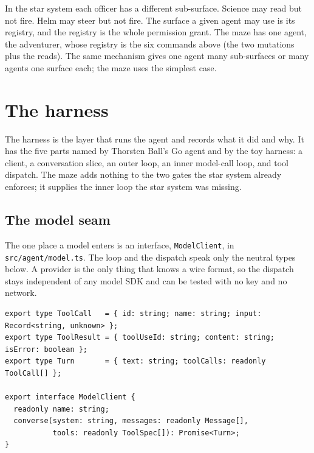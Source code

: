 \documentclass[11pt]{article}
\newcommand{\code}[1]{\texttt{#1}}
\begin{document}
\begin{keybox}
In the star system each officer has a different sub-surface. Science may read but
not fire. Helm may steer but not fire. The surface a given agent may use is its
registry, and the registry is the whole permission grant. The maze has one agent,
the adventurer, whose registry is the six commands above (the two mutations plus
the reads). The same mechanism gives one agent many sub-surfaces or many agents
one surface each; the maze uses the simplest case.
\end{keybox}

\section{The harness}

The harness is the layer that runs the agent and records what it did and why. It
has the five parts named by Thorsten Ball's Go agent and by the toy harness: a
client, a conversation slice, an outer loop, an inner model-call loop, and tool
dispatch. The maze adds nothing to the two gates the star system already enforces;
it supplies the inner loop the star system was missing.

\subsection{The model seam}

The one place a model enters is an interface, \code{ModelClient}, in
\code{src/agent/model.ts}. The loop and the dispatch speak only the neutral types
below. A provider is the only thing that knows a wire format, so the dispatch
stays independent of any model SDK and can be tested with no key and no network.

\begin{lstlisting}[language=TS]
export type ToolCall   = { id: string; name: string; input: Record<string, unknown> };
export type ToolResult = { toolUseId: string; content: string; isError: boolean };
export type Turn       = { text: string; toolCalls: readonly ToolCall[] };

export interface ModelClient {
  readonly name: string;
  converse(system: string, messages: readonly Message[],
           tools: readonly ToolSpec[]): Promise<Turn>;
}
\end{lstlisting}
\end{document}
